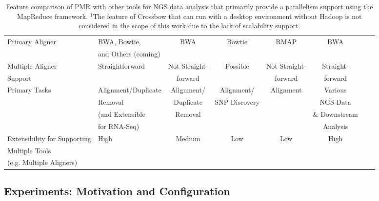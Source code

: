 \documentclass{acm_proc_article-sp}
\begin{document}
\begin{center}
\begin{table}[ht]
{\begin{tabular}{|l|l|c|c|c|c|c|c|}
Primary Aligner &  BWA, Bowtie,  &  BWA & Bowtie & RMAP &  BWA \\
& and Others (coming) &  &  &  &  \\ \hline
Multiple Aligner  & Straightforward & Not Straight- & Possible & Not Straight-  & Straight-  \\ 
Support &  & forward &   & forward  & forward \\\hline
Primary Tasks & Alignment/Duplicate  & Alignment/ & Alignment/ & Alignment &Various\\
  &  Removal & Duplicate & SNP Discovery & & NGS Data  \\  
           & (and Extensible &  Removal & &  & \& Downstream  \\
           & for RNA-Seq) & & &  & Analysis \\ \hline  
Extensibility for Supporting  &  High  & Medium &  Low & Low & High      \\
Multiple Tools  &      &  &  &  &   \\ 
(e.g. Multiple Aligners) & & & & & \\ \hline
\hline
\end{tabular}}
\hfill{}
\caption{Feature comparison of PMR with other tools for NGS data analysis that primarily provide a parallelism support using the MapReduce framework.  $^{1}${The feature of Crossbow that can run with a desktop environment without Hadoop is not considered in the scope of this work due to the lack of scalability support.} }
 \label{table:mr-comparison}
\end{table}
\end{center}




\subsection{Experiments: Motivation and Configuration}

\end{document}
